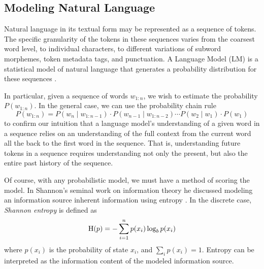 \subsection{Modeling Natural Language}\label{sec:introduction:language-models}

Natural language in its textual form may be represented as a sequence of tokens.
The specific granularity of the tokens in these sequences varies from the coarsest word level, to individual characters, to different variations of subword morphemes, token metadata tags, and punctuation.
A Language Model (LM) is a statistical model of natural language that generates a probability distribution for these sequences \cite{goldberg_2017, pappas_meyer_2012}.

In particular, given a sequence of words $w_{1:n}$, we wish to estimate the probability $P(w_{1:n})$.
In the general case, we can use the probability chain rule
\begin{equation}
    P(w_{1:n}) = P(w_n \mid w_{1:n - 1}) \cdot P(w_{n - 1} \mid w_{1:n - 2}) \cdots P(w_2 \mid w_1) \cdot P(w_1)\label{eq:language-models:chain-rule}
\end{equation}
to confirm our intuition that a language model's understanding of a given word in a sequence relies on an understanding of the full context from the current word all the back to the first word in the sequence.
That is, understanding future tokens in a sequence requires understanding not only the present, but also the entire past history of the sequence.

Of course, with any probabilistic model, we must have a method of scoring the model.
In Shannon's seminal work on information theory he discussed modeling an information source inherent information using entropy \cite{Shannon1948}.
In the discrete case, \textit{Shannon entropy} is defined as
\begin{equation}
    \operatorname{H}(p) = - \sum_{i=1}^n p(x_i) \log_b p(x_i) \label{eq:language-models:entropy}
\end{equation}
where $p(x_i)$ is the probability of state $x_i$, and $\sum_i p(x_i) = 1$.
Entropy can be interpreted as the information content of the modeled information source.

